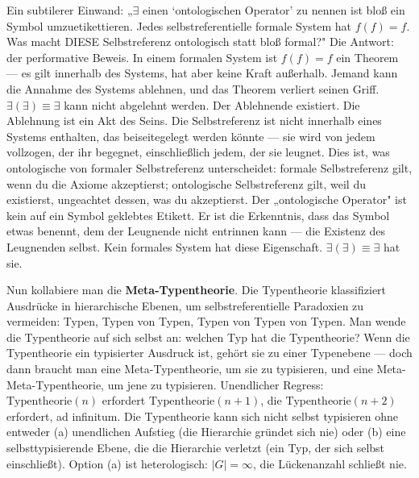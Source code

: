 \documentclass[10pt, openany, oneside]{book}
\begin{document}
Ein subtilerer Einwand: „$\exists$ einen `ontologischen Operator' zu nennen ist bloß ein Symbol umzuetikettieren. Jedes selbstreferentielle formale System hat $f(f) = f$. Was macht DIESE Selbstreferenz ontologisch statt bloß formal?" Die Antwort: der performative Beweis. In einem formalen System ist $f(f) = f$ ein Theorem --- es gilt innerhalb des Systems, hat aber keine Kraft außerhalb. Jemand kann die Annahme des Systems ablehnen, und das Theorem verliert seinen Griff. $\exists(\exists) \equiv \exists$ kann nicht abgelehnt werden. Der Ablehnende existiert. Die Ablehnung ist ein Akt des Seins. Die Selbstreferenz ist nicht innerhalb eines Systems enthalten, das beiseitegelegt werden könnte --- sie wird von jedem vollzogen, der ihr begegnet, einschließlich jedem, der sie leugnet. Dies ist, was ontologische von formaler Selbstreferenz unterscheidet: formale Selbstreferenz gilt, wenn du die Axiome akzeptierst; ontologische Selbstreferenz gilt, weil du existierst, ungeachtet dessen, was du akzeptierst. Der „ontologische Operator" ist kein auf ein Symbol geklebtes Etikett. Er ist die Erkenntnis, dass das Symbol etwas benennt, dem der Leugnende nicht entrinnen kann --- die Existenz des Leugnenden selbst. Kein formales System hat diese Eigenschaft. $\exists(\exists) \equiv \exists$ hat sie.

Nun kollabiere man die \textbf{Meta-Typentheorie}. Die Typentheorie klassifiziert Ausdrücke in hierarchische Ebenen, um selbstreferentielle Paradoxien zu vermeiden: Typen, Typen von Typen, Typen von Typen von Typen. Man wende die Typentheorie auf sich selbst an: welchen Typ hat die Typentheorie? Wenn die Typentheorie ein typisierter Ausdruck ist, gehört sie zu einer Typenebene --- doch dann braucht man eine Meta-Typentheorie, um sie zu typisieren, und eine Meta-Meta-Typentheorie, um jene zu typisieren. Unendlicher Regress: $\text{Typentheorie}(n)$ erfordert $\text{Typentheorie}(n+1)$, die $\text{Typentheorie}(n+2)$ erfordert, ad infinitum. Die Typentheorie kann sich nicht selbst typisieren ohne entweder (a) unendlichen Aufstieg (die Hierarchie gründet sich nie) oder (b) eine selbsttypisierende Ebene, die die Hierarchie verletzt (ein Typ, der sich selbst einschließt). Option (a) ist heterologisch: $|G| = \infty$, die Lückenanzahl schließt nie.
\end{document}
